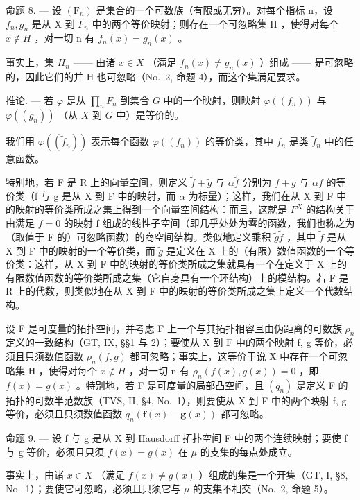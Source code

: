 命题 8. --- 设 \((\mathrm{F}_{n})\) 是集合的一个可数族（有限或无穷）。对每个指标 n，设 \(f_{n}, g_{n}\) 是从 X 到 \(F_{n}\) 中的两个等价映射；则存在一个可忽略集 H ，使得对每个 \(x \notin H\) ，对一切 n 有 \(f_{n}(x) = g_{n}(x)\) 。

事实上，集 \(H_{n}\) —— 由诸 \(x \in X\) （满足 \(f_{n}(x) \neq g_{n}(x)\) ）组成 —— 是可忽略的，因此它们的并 H 也可忽略（No.~2, 命题 4），而这个集满足要求。

推论. --- 若 \(\varphi\) 是从 \(\prod_{n} F_n\) 到集合 \(G\) 中的一个映射，则映射 \(\varphi((f_n))\) 与 \(\varphi((g_n))\) （从 \(X\) 到 \(G\) 中）是等价的。

我们用 \(\varphi((\widetilde{f}_n))\) 表示每个函数 \(\varphi((f_n))\) 的等价类，其中 \(f_n\) 是类 \(\widetilde{f}_n\) 中的任意函数。

特别地，若 F 是 R 上的向量空间，则定义 \(\widetilde{f} + \widetilde{g}\) 与 \(\alpha\widetilde{f}\) 分别为 \(f + g\) 与 \(\alpha f\) 的等价类（f 与 g 是从 X 到 F 中的映射，而 \(\alpha\) 为标量）；这样，我们在从 X 到 F 中的映射的等价类所成之集上得到一个向量空间结构：而且，这就是 \(F^{X}\) 的结构关于由满足 \(\widetilde{f} = \widetilde{0}\) 的映射 f 组成的线性子空间（即几乎处处为零的函数，我们也称之为（取值于 F 的）可忽略函数）的商空间结构。类似地定义乘积 \(\widetilde{g}\widetilde{f}\) ，其中 \(\widetilde{f}\) 是从 X 到 F 中的映射的一个等价类，而 \(\widetilde{g}\) 是定义在 X 上的（有限）数值函数的一个等价类：这样，从 X 到 F 中的映射的等价类所成之集就具有一个在定义于 X 上的有限数值函数的等价类所成之集（它自身具有一个环结构）上的模结构。若 F 是 R 上的代数，则类似地在从 X 到 F 中的映射的等价类所成之集上定义一个代数结构。

设 F 是可度量的拓扑空间，并考虑 F 上一个与其拓扑相容且由伪距离的可数族 \(\rho_{n}\) 定义的一致结构（GT, IX, §§1 与 2）；要使从 X 到 F 中的两个映射 f, g 等价，必须且只须数值函数 \(\rho_{n}(f,g)\) 都可忽略；事实上，这等价于说 X 中存在一个可忽略集 H ，使得对每个 \(x\notin H\) ，对一切 n 有 \(\rho_{n}(f(x),g(x))=0\) ，即 \(f(x)=g(x)\) 。特别地，若 F 是可度量的局部凸空间，且 \((q_{n})\) 是定义 F 的拓扑的可数半范数族（TVS, II, §4, No.~1），则要使从 X 到 F 中的两个映射 f, g 等价，必须且只须数值函数 \(q_{n}(\mathbf{f}(x)-\mathbf{g}(x))\) 都可忽略。

命题 9. --- 设 f 与 g 是从 X 到 Hausdorff 拓扑空间 F 中的两个连续映射；要使 f 与 g 等价，必须且只须 \(f(x) = g(x)\) 在 \(\mu\) 的支集的每点处成立。

事实上，由诸 \(x \in X\) （满足 \(f(x) \neq g(x)\) ）组成的集是一个开集（GT, I, §8, No.~1）；要使它可忽略，必须且只须它与 \(\mu\) 的支集不相交（No.~2, 命题 5）。

